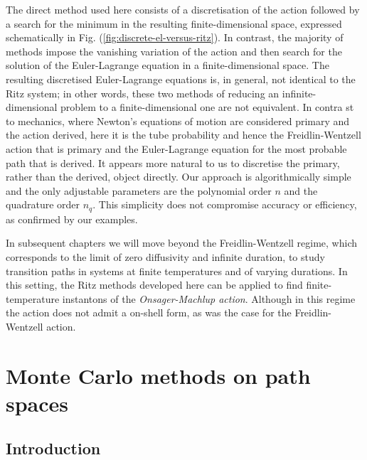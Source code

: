 The direct method used here consists of a discretisation of the action
followed by a search for the minimum in the resulting finite-dimensional
space, expressed schematically in Fig. (\ref{fig:discrete-el-versus-ritz}).
In contrast, the majority of methods impose the vanishing variation
of the action and then search for the solution of the Euler-Lagrange
equation in a finite-dimensional space. The resulting discretised
Euler-Lagrange equations is, in general, not identical to the Ritz
system; in other words, these two methods of reducing an infinite-dimensional
problem to a finite-dimensional one are not equivalent. In contra st
to mechanics, where Newton's equations of motion are considered primary
and the action derived, here it is the tube probability and hence
the Freidlin-Wentzell action that is primary and the Euler-Lagrange
equation for the most probable path that is derived. It appears more
natural to us to discretise the primary, rather than the derived,
object directly. Our approach is algorithmically simple and the only
adjustable parameters are the polynomial order $n$ and the quadrature
order $n_{q}.$ This simplicity does not compromise accuracy or efficiency,
as confirmed by our examples.  

In subsequent chapters we will move beyond the Freidlin-Wentzell regime, which corresponds to the limit of zero diffusivity and infinite duration, to study transition paths in systems at finite temperatures and of varying durations. In this setting, the Ritz methods developed here can be applied to find finite-temperature instantons of the \textit{Onsager-Machlup action}. Although in this regime the action does not admit a on-shell form, as was the case for the Freidlin-Wentzell action.




\chapter{Monte Carlo methods on path spaces} \label{ch:Monte Carlo methods in Path Spaces}

\section{Introduction}

